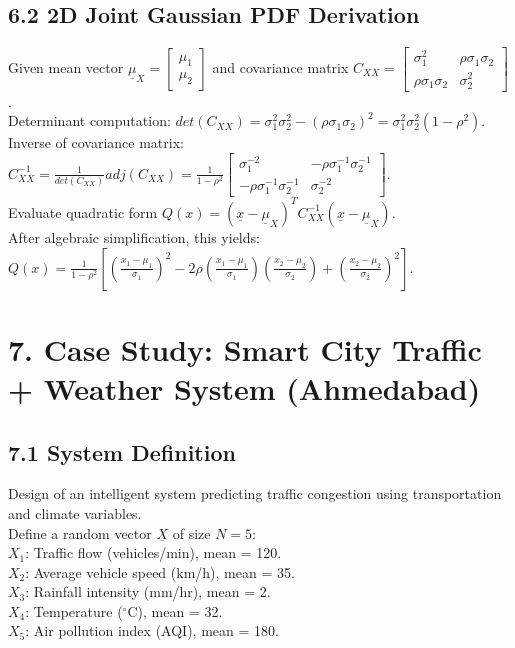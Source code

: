 \documentclass[12pt]{article}
\begin{document}
\subsection*{6.2 2D Joint Gaussian PDF Derivation}
Given mean vector $\underline{\mu}_{X} = \begin{bmatrix} \mu_{1} \\ \mu_{2} \end{bmatrix}$ and covariance matrix $C_{XX} = \begin{bmatrix} \sigma_{1}^{2} & \rho\sigma_{1}\sigma_{2} \\ \rho\sigma_{1}\sigma_{2} & \sigma_{2}^{2} \end{bmatrix}$. \\
Determinant computation: $det(C_{XX}) = \sigma_{1}^{2}\sigma_{2}^{2} - (\rho\sigma_{1}\sigma_{2})^{2} = \sigma_{1}^{2}\sigma_{2}^{2}(1-\rho^{2})$. \\
Inverse of covariance matrix: $C_{XX}^{-1} = \frac{1}{det(C_{XX})}adj(C_{XX}) = \frac{1}{1-\rho^{2}}\begin{bmatrix} \sigma_{1}^{-2} & -\rho\sigma_{1}^{-1}\sigma_{2}^{-1} \\ -\rho\sigma_{1}^{-1}\sigma_{2}^{-1} & \sigma_{2}^{-2} \end{bmatrix}$. \\
Evaluate quadratic form $Q(x) = (\underline{x}-\underline{\mu}_{X})^{T}C_{XX}^{-1}(\underline{x}-\underline{\mu}_{X})$. \\
After algebraic simplification, this yields: $Q(x) = \frac{1}{1-\rho^{2}}[(\frac{x_{1}-\mu_{1}}{\sigma_{1}})^{2} - 2\rho(\frac{x_{1}-\mu_{1}}{\sigma_{1}})(\frac{x_{2}-\mu_{2}}{\sigma_{2}}) + (\frac{x_{2}-\mu_{2}}{\sigma_{2}})^{2}]$.

\section*{7. Case Study: Smart City Traffic + Weather System (Ahmedabad)}
\subsection*{7.1 System Definition}
Design of an intelligent system predicting traffic congestion using transportation and climate variables. \\
Define a random vector $\underline{X}$ of size $N=5$: \\
$X_{1}$: Traffic flow (vehicles/min), mean = 120. \\
$X_{2}$: Average vehicle speed (km/h), mean = 35. \\
$X_{3}$: Rainfall intensity (mm/hr), mean = 2. \\
$X_{4}$: Temperature ($^\circ$C), mean = 32. \\
$X_{5}$: Air pollution index (AQI), mean = 180.
\end{document}
